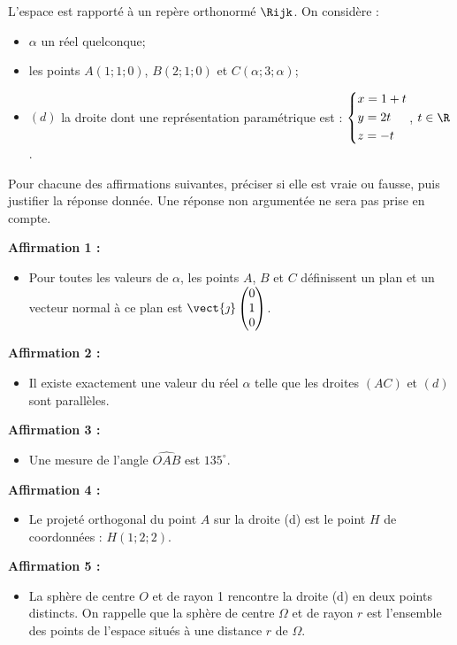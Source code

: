 L'espace est rapporté à un repère orthonormé $\Rijk$. On considère :

\begin{itemize}
	\item $\alpha$ un réel quelconque;
	\item les points $A(1;1;0)$, $B(2;1;0)$ et $C(\alpha;3;\alpha)$;
	\item $(d)$ la droite dont une représentation paramétrique est : $\begin{dcases}x=1+t \\ y=2 t \\ z=-t\end{dcases}$, $t \in \R$.
\end{itemize}

Pour chacune des affirmations suivantes, préciser si elle est vraie ou fausse, puis justifier la réponse donnée. Une réponse non argumentée ne sera pas prise en compte.

\bigskip

\textbf{Affirmation 1 :}

\begin{itemize}
	\item[] Pour toutes les valeurs de $\alpha$, les points $A$, $B$ et $C$ définissent un plan et un vecteur normal à ce plan est $\vect{\jmath}\begin{pmatrix}0\\1\\0\end{pmatrix}$.
\end{itemize}

\medskip

\textbf{Affirmation 2 :}

\begin{itemize}
	\item[] Il existe exactement une valeur du réel $\alpha$ telle que les droites $(A C)$ et $(d)$ sont parallèles.
\end{itemize}

\medskip

\textbf{Affirmation 3 :}

\begin{itemize}
	\item[] Une mesure de l'angle $\widehat{OAB}$ est $135^{\circ}$.
\end{itemize}

\medskip

\textbf{Affirmation 4 :}

\begin{itemize}
	\item[] Le projeté orthogonal du point $A$ sur la droite (d) est le point $H$ de coordonnées : $H(1;2;2)$.
\end{itemize}

\medskip

\textbf{Affirmation 5 :}

\begin{itemize}
	\item[] La sphère de centre $O$ et de rayon 1 rencontre la droite (d) en deux points distincts. On rappelle que la sphère de centre $\Omega$ et de rayon $r$ est l'ensemble des points de l'espace situés à une distance $r$ de $\Omega$.
\end{itemize}